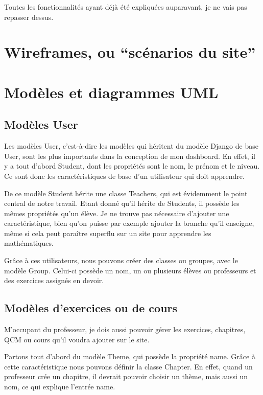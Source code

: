 \documentclass[letterpaper,10pt,french]{sphinxmanual}
\begin{document}
Toutes les fonctionnalités ayant déjà été expliquées auparavant, je ne vais pas
repasser dessus.


\section{Wireframes, ou ``scénarios du site''}
\label{documentation:wireframes-ou-scenarios-du-site}

\section{Modèles et diagrammes UML}
\label{documentation:modeles-et-diagrammes-uml}

\subsection{Modèles User}
\label{documentation:modeles-user}
Les modèles User, c'est-à-dire les modèles qui héritent du modèle Django de base
User, sont les plus importants dans la conception de mon dashboard. En effet, il
y a tout d'abord Student, dont les propriétés sont le nom, le prénom et le
niveau. Ce sont donc les caractéristiques de base d'un utilisateur qui doit
apprendre.

De ce modèle Student hérite une classe Teachers, qui est évidemment le point
central de notre travail. Etant donné qu'il hérite de Students, il possède
les mêmes propriétés qu'un élève. Je ne trouve pas nécessaire d'ajouter une
caractéristique, bien qu'on puisse par exemple ajouter la branche qu'il
enseigne, même si cela peut paraître superflu sur un site pour apprendre
les mathématiques.

Grâce à ces utilisateurs, nous pouvons créer des classes ou groupes, avec le
modèle Group. Celui-ci possède un nom, un ou plusieurs élèves ou professeurs et
des exercices assignés en devoir.


\subsection{Modèles d'exercices ou de cours}
\label{documentation:modeles-d-exercices-ou-de-cours}
M'occupant du professeur, je dois aussi pouvoir gérer les exercices, chapitres,
QCM ou cours qu'il voudra ajouter sur le site.

Partons tout d'abord du modèle Theme, qui possède la propriété name. Grâce à
cette caractéristique nous pouvons définir la classe Chapter. En effet, quand un
professeur crée un chapitre, il devrait pouvoir choisir un thème, mais aussi un
nom, ce qui explique l'entrée name.
\end{document}

